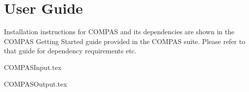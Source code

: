 \newpage\section{User Guide}\label{sec:UserGuide}

Installation instructions for COMPAS and its dependencies are shown in the COMPAS Getting Started guide provided in the COMPAS suite. Please refer to that guide for dependency requirements etc.



{COMPASInput.tex}


{COMPASOutput.tex}